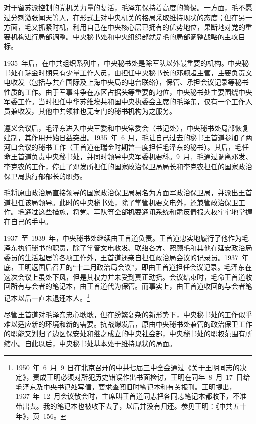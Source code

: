 对于留苏派控制的党机关力量的复活，毛泽东保持着高度的警惕。一方面，毛不愿过分刺激张闻天等人，在形式上对中央机关的格局采取维持现状的态度；但在另一方面，毛又抓紧时机，利用自己在中央核心层已拥有的优势地位，果断地对党的重要机构进行局部调整。中央秘书处和中央组织部就是毛的局部调整战略的主攻目标。

1935~年后，在中共组织系列中，中央秘书处是除军队以外最重要的机构。中央秘书处在瑞金时期只有少量工作人员，由担任中央秘书长的邓颖超主管，主要负责文电收发（包括与共产国际及上海中央局的电台联络），保管、承担会议记录等秘书性质的工作。由于军事斗争在苏区占据头等重要的地位，中央秘书处主要围绕中央军委工作。当时担任中华苏维埃共和国中央执委会主席的毛泽东，仅有一个工作人员兼收发，其他中共领袖也无专门的秘书机构为之服务。

遵义会议后，毛泽东进入中央军委和中央常委会（书记处），中央秘书处局部恢复建制，其作用开始日益突出。1935~年~6~月，毛让自己过去的秘书王首道参加了两河口会议的秘书工作（王首道在瑞金时期曾一度担任毛泽东的秘书）。其后，毛任命王首道负责中央秘书处，并同时领导中央军委机要科。9~月，毛通过调离邓发、李克农的工作，停止了邓发所担任的国家政治保卫局局长和李克农担任的国家政治保卫局执行部部长的职务。

毛将原由政治局直接领导的国家政治保卫局易名为方面军政治保卫局，并派出王首道担任该局领导。此时的中央秘书处，除了掌管机要文电外，还兼管政治保卫工作。毛通过这些措施，将党、军队等全部机要通讯系统和肃反情报大权牢牢地掌握在自己的手中。

1937~至~1939~年，中央秘书处继续由王首道负责。王首道忠实地履行了他作为毛泽东执行秘书的职责，除了掌管文电收发、联络各方、照顾毛和其他在延安政治局委员的生活起居等各项工作外，王首道还亲自担任政治局会议的记录员。1937~年底，王明返国后召开的“十二月政治局会议”，即由王首道担任会议记录。毛泽东在这次会议上虽处下风，但是其权力并未受到真正动摇。会议结束时，毛命王首道收回所有与会者的笔记本，由王首道代为保管。而事实上，由王首道收回的与会者笔记本以后一直未退还本人。\footnote{1950~年~6~月~9~日在北京召开的中共七届三中全会通过《关于王明同志的决定》，责成王明必须对所犯历史错误作出书面检讨，王明在同年~8~月~17~日给毛泽东及中央书记处写信，要求查阅旧时笔记本和有关报刊。王明提出，1937~年~12~月会议散会时，主席叫王首道同志把各同志笔记本都收下，不准带出去。我的笔记本也被收下去了，以后并没有归还。参见王明：《中共五十年》，页~156。}

尽管王首道对毛泽东忠心耿耿，但在纷繁复杂的新形势下，中央秘书处的工作似乎难以适应新的环境和新的需要。抗战爆发后，原由中央秘书处兼管的政治保卫工作的职能又划归了边区保安处和继之成立的中央社会部，中央秘书处的职权范围有所缩小。自此以后，中央秘书处基本处于维持现状的局面。

